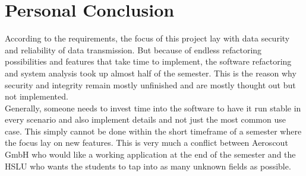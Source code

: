 \section{Personal Conclusion}
According to the requirements, the focus of this project lay with data security and reliability of data transmission. But because of endless refactoring possibilities and features that take time to implement, the software refactoring and system analysis took up almost half of the semester. This is the reason why security and integrity remain mostly unfinished and are mostly thought out but not implemented.\\
Generally, someone needs to invest time into the software to have it run stable in every scenario and also implement details and not just the most common use case. This simply cannot be done within the short timeframe of a semester where the focus lay on new features. This is very much a conflict between Aeroscout GmbH who would like a working application at the end of the semester and the HSLU who wants the students to tap into as many unknown fields as possible.